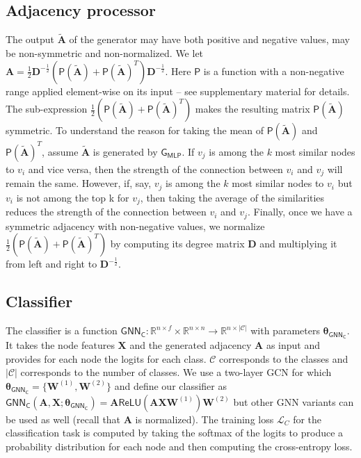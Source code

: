 \documentclass{article}
\def\mA{{\bm{A}}}
\def\mD{{\bm{D}}}
\def\mW{{\bm{W}}}
\def\mX{{\bm{X}}}
\newcommand{\classes}[1]{\ensuremath{\mathcal{#1}}}
\newcommand{\loss}[1]{\ensuremath{\mathcal{#1}}}
\newcommand{\func}[1]{\ensuremath{\mathsf{#1}}}
\begin{document}
\subsection{Adjacency processor} \label{sec:processor}
The output $\tilde{\mA}$ of the generator may have both positive and negative values, may be non-symmetric and non-normalized. We let $\mA = \frac{1}{2}\mD^{-\frac{1}{2}}(\func{P}(\tilde{\mA})+\func{P}(\tilde{\mA})^T)\mD^{-\frac{1}{2}}$.
Here $\func{P}$ is a function with a non-negative range applied element-wise on its input -- see supplementary material for details. The sub-expression $\frac{1}{2}(\func{P}(\tilde{\mA})+\func{P}(\tilde{\mA})^T)$ makes the resulting matrix $\func{P}(\tilde{\mA})$ symmetric. To understand the reason for taking the mean of $\func{P}(\tilde{\mA})$ and $\func{P}(\tilde{\mA})^T$, assume $\tilde{\mA}$ is generated by $\func{G_{MLP}}$. If $v_j$ is among the $k$ most similar nodes to $v_i$ and vice versa, then the strength of the connection between $v_i$ and $v_j$ will remain the same. However, if, say, $v_j$ is among the $k$ most similar nodes to $v_i$ but $v_i$ is not among the top k for $v_j$, then taking the average of the similarities reduces the strength of the connection between $v_i$ and $v_j$. Finally, once we have a symmetric adjacency with non-negative values, we normalize $\frac{1}{2}(\func{P}(\tilde{\mA})+\func{P}(\tilde{\mA})^T)$ by computing its degree matrix $\mD$ and multiplying it from left and right to $\mD^{-\frac{1}{2}}$.

\subsection{Classifier} \label{sec:classifier}
The classifier is a function $\func{GNN_C}:\mathbb{R}^{n\times f}\times\mathbb{R}^{n\times n}\rightarrow \mathbb{R}^{n\times |\classes{C}|}$ with parameters $\bm{\theta}_\func{GNN_C}$. It takes the node features $\mX$ and the generated adjacency $\mA$ as input and provides for each node the logits for each class. $\classes{C}$ corresponds to the classes and $|\classes{C}|$ corresponds to the number of classes. We use a two-layer GCN for which $\bm{\theta}_\func{GNN_C}=\{\mW^{(1)}, \mW^{(2)}\}$ and define our classifier as $\func{GNN_C}(\mA, \mX; \bm{\theta}_\func{GNN_C})=\mA\func{ReLU}(\mA\mX\mW^{(1)})\mW^{(2)}$ but other GNN variants can be used as well (recall that $\mA$ is normalized). The training loss $\loss{L}_C$ for the classification task is computed by taking the softmax of the logits to produce a probability distribution for each node and then computing the cross-entropy loss.
\end{document}
